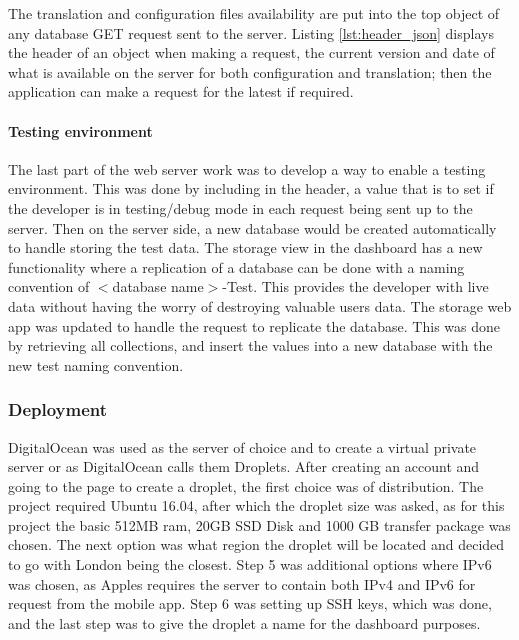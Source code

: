 The translation and configuration files availability are put into the top object of any database GET request sent to the server. Listing \ref{lst:header_json} displays the header of an object when making a request, the current version and date of what is available on the server for both configuration and translation; then the application can make a request for the latest if required.



\paragraph{Testing environment}

The last part of the web server work was to develop a way to enable a testing environment. This was done by including in the header, a value that is to set if the developer is in testing/debug mode in each request being sent up to the server. Then on the server side, a new database would be created automatically to handle storing the test data. The storage view in the dashboard has a new functionality where a replication of a database can be done with a naming convention of $<$database name$>$-Test. This provides the developer with live data without having the worry of destroying valuable users data. The storage web app was updated to handle the request to replicate the database. This was done by retrieving all collections, and insert the values into a new database with the new test naming convention.

\subsubsection{Deployment}

DigitalOcean was used as the server of choice and to create a virtual private server or as DigitalOcean calls them Droplets. After creating an account and going to the page to create a droplet, the first choice was of distribution. The project required Ubuntu 16.04, after which the droplet size was asked, as for this project the basic 512MB ram, 20GB SSD Disk and 1000 GB transfer package was chosen. The next option was what region the droplet will be located and decided to go with London being the closest. Step 5 was additional options where IPv6 was chosen, as Apples requires the server to contain both IPv4 and IPv6 for request from the mobile app. Step 6 was setting up SSH keys, which was done, and the last step was to give the droplet a name for the dashboard purposes.


